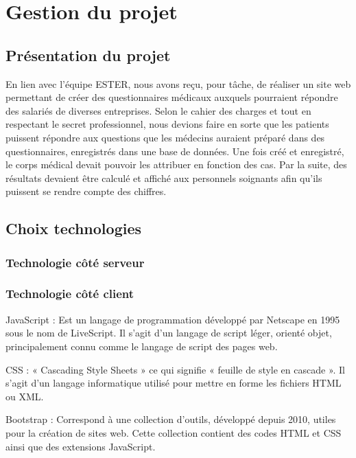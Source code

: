 \chapter{Gestion du projet}

\section{Présentation du projet}

En lien avec l'équipe ESTER, nous avons reçu, pour tâche, de réaliser un site web permettant de créer des questionnaires médicaux auxquels pourraient répondre des salariés de diverses entreprises. Selon le cahier des charges et tout en respectant le secret professionnel, nous devions faire en sorte que les patients puissent répondre aux questions que les médecins auraient préparé dans des questionnaires, enregistrés dans une base de données. Une fois créé et enregistré, le corps médical devait pouvoir les attribuer en fonction des cas. Par la suite, des résultats devaient être calculé et affiché aux personnels soignants afin qu'ils puissent se rendre compte des chiffres. 

\section{Choix technologies}

\subsection{Technologie côté serveur}


\subsection{Technologie côté client}

JavaScript : Est un langage de programmation développé par Netscape en 1995 sous le nom de LiveScript. Il s'agit d'un langage de script léger, orienté objet, principalement connu comme le langage de script des pages web. \

CSS : « Cascading Style Sheets » ce qui signifie « feuille de style en cascade ». 
Il s'agit d'un langage informatique utilisé pour mettre en forme les fichiers HTML ou XML. \

Bootstrap : Correspond à une collection d'outils, développé depuis 2010, utiles pour la création de sites web. Cette collection contient des codes HTML et CSS ainsi que des extensions JavaScript.

